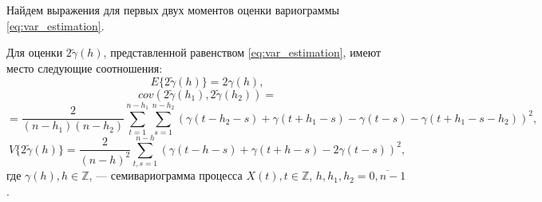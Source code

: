 Найдем выражения для первых двух моментов оценки вариограммы \eqref{eq:var_estimation}.
\begin{Theorem}
	Для оценки $ 2 \tilde{\gamma}(h) $, представленной равенством \eqref{eq:var_estimation}, имеют место следующие соотношения:
	\begin{equation}
	\label{eq:est_ex}
		E \{2 \tilde{\gamma}(h) \} = 2 \gamma(h), %
	\end{equation}
	\begin{equation*}
		cov(2 \tilde{\gamma}(h_1), 2 \tilde{\gamma}(h_2)) =
	\end{equation*}
	\begin{equation}
	\label{eq:est_cov}
		= \frac{2}{(n - h_1)(n - h_2)} \sum_{t = 1}^{n - h_1}\sum_{s = 1}^{n - h_2} (\gamma(t - h_2 - s) + \gamma(t + h_1 - s) - \gamma(t - s) - \gamma(t + h_1 - s - h_2))^2,
	\end{equation}
	\begin{equation}
	\label{eq:est_var}
		V \{ 2 \tilde{\gamma}(h) \} = \frac{2}{(n-h)^2}\sum_{t,s = 1}^{n - h} ( \gamma(t - h - s) + \gamma(t + h - s) - 2\gamma(t - s) )^2,
	\end{equation}
	где $ \gamma(h), h \in \mathbb{Z} $, --- семивариограмма процесса $ X(t), t \in \mathbb{Z}$, $ h, h_1, h_2 = \overline{0, n - 1} $.
\end{Theorem}
